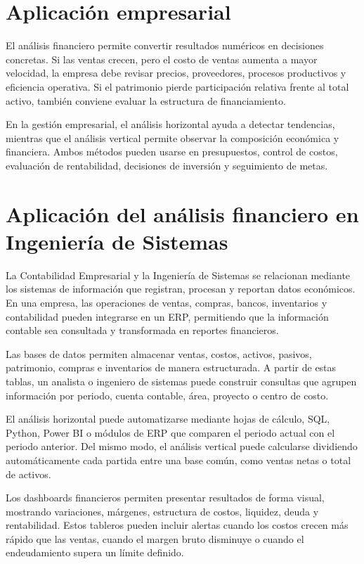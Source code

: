 \section{Aplicación empresarial}

El análisis financiero permite convertir resultados numéricos en decisiones concretas. Si las ventas crecen, pero el costo de ventas aumenta a mayor velocidad, la empresa debe revisar precios, proveedores, procesos productivos y eficiencia operativa. Si el patrimonio pierde participación relativa frente al total activo, también conviene evaluar la estructura de financiamiento.

En la gestión empresarial, el análisis horizontal ayuda a detectar tendencias, mientras que el análisis vertical permite observar la composición económica y financiera. Ambos métodos pueden usarse en presupuestos, control de costos, evaluación de rentabilidad, decisiones de inversión y seguimiento de metas.

\section{Aplicación del análisis financiero en Ingeniería de Sistemas}

La Contabilidad Empresarial y la Ingeniería de Sistemas se relacionan mediante los sistemas de información que registran, procesan y reportan datos económicos. En una empresa, las operaciones de ventas, compras, bancos, inventarios y contabilidad pueden integrarse en un ERP, permitiendo que la información contable sea consultada y transformada en reportes financieros.

Las bases de datos permiten almacenar ventas, costos, activos, pasivos, patrimonio, compras e inventarios de manera estructurada. A partir de estas tablas, un analista o ingeniero de sistemas puede construir consultas que agrupen información por periodo, cuenta contable, área, proyecto o centro de costo.

El análisis horizontal puede automatizarse mediante hojas de cálculo, SQL, Python, Power BI o módulos de ERP que comparen el periodo actual con el periodo anterior. Del mismo modo, el análisis vertical puede calcularse dividiendo automáticamente cada partida entre una base común, como ventas netas o total de activos.

Los dashboards financieros permiten presentar resultados de forma visual, mostrando variaciones, márgenes, estructura de costos, liquidez, deuda y rentabilidad. Estos tableros pueden incluir alertas cuando los costos crecen más rápido que las ventas, cuando el margen bruto disminuye o cuando el endeudamiento supera un límite definido.

